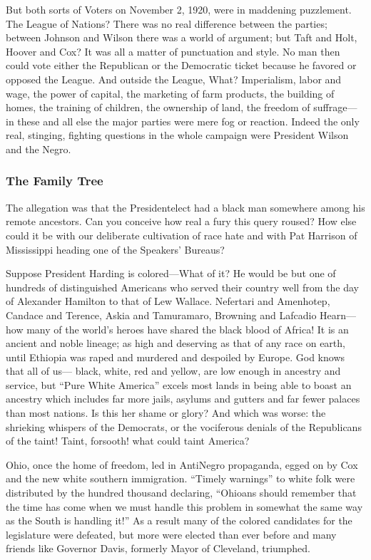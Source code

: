 \documentclass[letterpaper,10pt,english]{jupyterBook}
\begin{document}
\sphinxAtStartPar
But both sorts of Voters on November 2, 1920, were in maddening puzzlement. The League of Nations? There was no real difference between the parties; between Johnson and Wilson there was a world of argument; but Taft and Holt, Hoover and Cox? It was all a matter of punctuation and style. No man then could vote either the Republican or the Democratic ticket because he favored or opposed the League. And outside the League, What? Imperialism, labor and wage, the power of capital, the marketing of farm products, the building of homes, the training of children, the ownership of land, the freedom of suffrage—in these and all else the major parties were mere fog or reaction. Indeed the only real, stinging, fighting questions in the whole campaign were President Wilson and the Negro.


\subsubsection{The Family Tree}
\label{\detokenize{Volumes/21/02/unreal_campaign:the-family-tree}}
\sphinxAtStartPar
The allegation was that the President\sphinxhyphen{}elect had a black man somewhere among his remote ancestors. Can you conceive how real a fury this query roused? How else could it be with our deliberate cultivation of race hate and with Pat Harrison of Mississippi heading one of the Speakers’ Bureaus?

\sphinxAtStartPar
Suppose President Harding is colored—What of it? He would be but one of hundreds of distinguished Americans who served their country well from the day of Alexander Hamilton to that of Lew Wallace. Nefertari and Amenhotep, Candace and Terence, Askia and Tamuramaro, Browning and Lafcadio Hearn—how many of the world’s heroes have shared the black blood of Africa! It is an ancient and noble lineage; as high and deserving as that of any race on earth, until Ethiopia was raped and murdered and despoiled by Europe. God knows that all of us— black, white, red and yellow, are low enough in ancestry and service, but “Pure White America” excels most lands in being able to boast an ancestry which includes far more jails, asylums and gutters and far fewer palaces than most nations. Is this her shame or glory? And which was worse: the shrieking whispers of the Democrats, or the vociferous denials of the Republicans of the taint! Taint, forsooth! what could taint America?

\sphinxAtStartPar
Ohio, once the home of freedom, led in Anti\sphinxhyphen{}Negro propaganda, egged on by Cox and the new white southern immigration. “Timely warnings” to white folk were distributed by the hundred thousand declaring, “Ohioans should remember that the time has come when we must handle this problem in somewhat the same way as the South is handling it!” As a result many of the colored candidates for the legislature were defeated, but more were elected than ever before and many friends like Governor Davis, formerly Mayor of Cleveland, triumphed.
\end{document}
